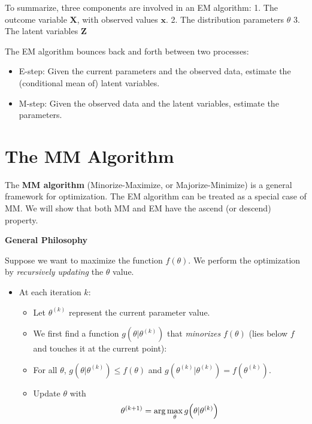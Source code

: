 \documentclass[
]{book}
\begin{document}
To summarize, three components are involved in an EM algorithm:
1. The outcome variable \(\mathbf{X}\), with observed values \(\mathbf{x}\).
2. The distribution parameters \(\theta\)
3. The latent variables \(\mathbf{Z}\)

The EM algorithm bounces back and forth between two processes:

\begin{itemize}
\item
  E-step: Given the current parameters and the observed data, estimate the (conditional mean of) latent variables.
\item
  M-step: Given the observed data and the latent variables, estimate the parameters.
\end{itemize}

\section{The MM Algorithm}\label{the-mm-algorithm}

The \textbf{MM algorithm} (Minorize-Maximize, or Majorize-Minimize) is a general framework for optimization. The EM algorithm can be treated as a special case of MM. We will show that both MM and EM have the ascend (or descend) property.

\textbf{General Philosophy}

Suppose we want to maximize the function \(f\left(\theta\right)\). We perform the optimization by \emph{recursively updating} the \(\theta\) value.

\begin{itemize}
\item
  At each iteration \(k\):

  \begin{itemize}
  \item
    Let \(\theta^{(k)}\) represent the current parameter value.
  \item
    We first find a function \(g\left(\theta|\theta^{(k)}\right)\) that \emph{minorizes} \(f\left(\theta\right)\) (lies below \(f\) and touches it at the current point):
  \item
    For all \(\theta\), \(g\left(\theta|\theta^{(k)} \right) \leq f\left(\theta\right)\) and \(g\left(\theta^{(k)}|\theta^{(k)} \right) = f \left(\theta^{(k)} \right)\).
  \item
    Update \(\theta\) with
    \[\theta^{(k+1)} = \arg \max_{\theta} g\Bigl(\theta|\theta^{(k)} \Bigr) \]
  \end{itemize}
\end{itemize}
\end{document}
